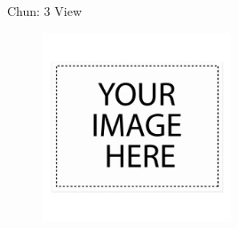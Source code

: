 \documentclass[10pt]{beamer}
\begin{document}
\begin{frame}{Chun: 3 View}
\begin{figure}
\centering
\includegraphics[width=0.5\textwidth]{Chun_3_View.png}
\end{figure}
\end{frame}
\end{document}
